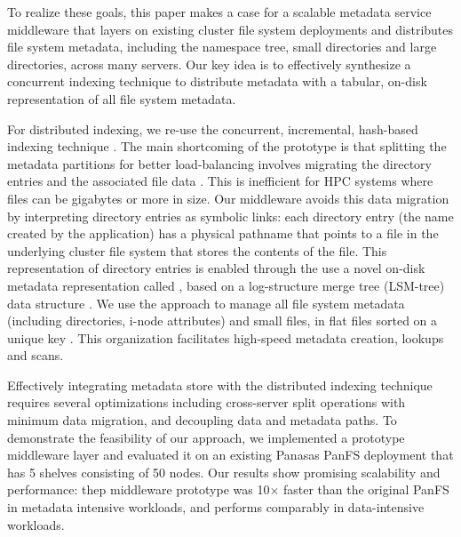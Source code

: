 To realize these goals, this paper makes a case for a scalable metadata service
middleware that layers on existing cluster file system deployments and
distributes file system metadata, including the namespace tree, small
directories and large directories, across many servers.
Our key idea is to effectively synthesize a concurrent indexing
technique to distribute metadata with a tabular, on-disk representation of all
file system metadata.

For distributed indexing, we re-use the concurrent, incremental, hash-based
\giga{} indexing technique \cite{GIGA11}.
The main shortcoming of the \giga{} prototype is that splitting
the metadata partitions for better load-balancing involves migrating the
directory entries and the associated file data \cite{GIGA11}.
This is inefficient for HPC systems where files can be gigabytes or more in
size. Our middleware avoids this data migration by interpreting directory
entries as symbolic links: each directory entry (the name created by the
application) has a physical pathname that points to a file in the underlying
cluster file system that stores the contents of the file.
This representation of directory entries is enabled through the use a novel
on-disk metadata representation called \tfs \cite{TableFS},
based on a log-structure merge tree (LSM-tree) data structure \cite{ONeil1996}.
We use the \tfs approach to manage all file system metadata
(including directories, i-node attributes) and small files,
in flat files sorted on a unique key \cite{LevelDB}.
This organization facilitates high-speed metadata creation, lookups and scans.

Effectively integrating \tfs metadata store with the distributed indexing
technique requires several optimizations including cross-server split operations
with minimum data migration, and decoupling data and metadata paths.
To demonstrate the feasibility of our approach,
we implemented a prototype middleware layer and evaluated it
on an existing Panasas PanFS deployment \cite{PanFS} that has 5 shelves consisting of 50 nodes.
Our results show promising scalability and performance:
thep middleware prototype was 10$\times$ faster than the original PanFS
in metadata intensive workloads, and performs comparably in data-intensive workloads.


